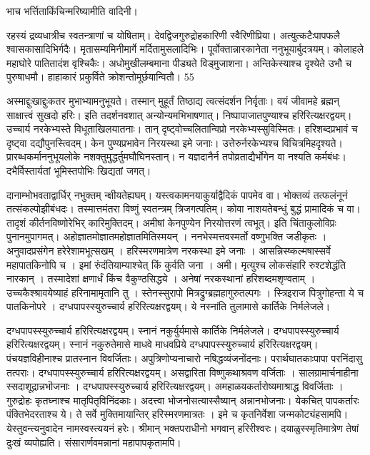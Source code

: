 भाच भर्त्तिताकिंचिन्मरिष्यामीति वादिनी।

रहस्यं द्रव्यधात्रीच स्वतन्त्राणां च योषिताम्।
देवद्विजगुरुद्रोहकारिणी स्वैरिणीप्रिया।
अत्युत्कटैःपापफलै श्वासकासादिभिर्गदैः।
मृतासम्यमिनीमार्गे मर्दितामुसलादिभिः।
पूर्वोक्तान्नारकानेता ननुभूयार्बुदत्रयम्।
कोलाहले महाघोरे पातितादंश वृश्चिकैः।
अधोमुखीलम्बमाना पीड्यते विड्मुजाशना।
अन्तिकेस्याश्च दृश्येते उभौ च पुरुषाधमौ।
हाहाकारं प्रकुर्विते क्रोशन्तोमूर्छयान्वितौ।
55

अस्माद्दुःखाद्दुःकतर मुभाभ्यामनुभूयते।
तस्मान् मुहूर्तं तिष्ठाद्य त्वत्संदर्शन निर्वृताः।
वयं जीवामहे ब्रह्मन् साक्षात्त्वं सुखदो हरिः।
इति तदर्शनवशात् अन्योन्यमभिभाषणात्।
निष्पापाजातपुण्याश्च हरिरित्यक्षरद्वयम्।
उच्चार्य नरकेभ्यस्ते विधूताखिलयातनाः।
तान् दृष्ट्वोच्चलितान्विप्रो नरकेभ्यस्सुविस्मितः।
हरिशब्दप्रभावं च दृष्ट्वा दद्यौपुनस्त्विदम्।
केन पुण्यप्रभावेन निरयस्था इमे जनाः।
उत्तेरुर्नरकेभ्यश्च विचित्रमिहदृश्यते।
प्रारब्धकर्माननुभूयलोके नशक्तुमुद्धर्तुमघौघिनस्तान्।
न यज्ञदानैर्न तपोव्रताद्यैर्भोगेन वा नश्यति कर्मबंधः।
दभैर्विस्तार्यतां भूमिस्तपोभिः खिद्यतां जगत्।

दानाम्भोभवताद्वार्धिर् नभुक्तम् न्क्षीयतेह्यघम्।
यस्त्वकामनयाकुर्याद्वैदिकं पापमेव वा।
भोक्तव्यं तत्फलंनूनं तत्संकल्पोझीबंधदः।
तस्मात्तमंतरा विष्णुं स्वतन्त्रम् त्रिजगत्पतिम्।
कोवा नाशयतेबन्धुं बुद्धं प्रामादिकं च वा।
तादृशं कीर्तनविष्णोरेभिर् कारिमुक्तिदम्।
अमीषां केनपुण्येन निरयोत्तरणं त्वभूत्।
इति चिंताकुलोविप्रः पुनानमुपागमत्।
अहोज्ञातमोज्ञातमहोज्ञातमितिस्मयन् ।
ननभेस्मत्तवस्मर्तो वष्णुभक्ति जडीकृतः ।
अनुवादप्रसंगेन हरेरेशामभूत्सखम् ।
हरिस्मरणमात्रेण नरकस्था इमे जनाः ।
आसन्निस्ष्कल्मषास्सर्वे महापातकिनोपि च ।
इमां रुंदंतियाम्याश्चेत् किं कुर्वति जना ।
अमी।
मृत्युश्च लोकसंहारि रुश्टशेद्धंति नारकान् ।
तस्मादेशां क्षणार्धं किंच वैकुण्ठसिद्धये ।
अनेषां नरकस्थानां हरिशब्दमशृण्वताम् ।
उच्चकैश्श्रावयेष्याहं हरिनामामृतानि तु ।
स्तेनस्सुरापो मित्रद्रुग्ब्रह्महागुरुतल्पगः ।
स्त्रिइराज पित्रुगोहन्ता ये च पातकिनोपरे ।
दग्धपापस्स्युरुच्चार्य हरिरित्यक्षरद्वयम्।
ये नस्नांति तुलामासे कार्तिके निर्मलेजले।

दग्धपापस्स्युरुच्चार्य हरिरित्यक्षरद्वयम्।
स्नानं नकुर्युर्यमासे कार्तिके निर्मलेजले।
दग्धपापस्स्युरुच्चार्य हरिरित्यक्षरद्वयम्।
स्नानं नकुरुतेमासे माधवे माधवप्रिये दग्धपापस्स्युरुच्चार्य हरिरित्यक्षरद्वयम्।
पंचयज्ञविहीनाश्च प्रातस्नान विवर्जिताः।
अपुत्रिणोप्यनाचारो नषिद्धव्यंजनोंदनाः।
परार्थघातकाःपापा परनिंदासु तत्पराः।
दग्धपापस्स्युरुच्चार्य हरिरित्यक्षरद्वयम्।
असद्वारिता विष्णुकथाश्रवण वर्जिताः ।
सालग्रामार्चनाहीना स्सदाशूद्रान्नभॊजनाः ।
दग्धपापस्स्युरुच्चार्य हरिरित्यक्षरद्वयम्।
अमहाळयकर्तारोष्यमाश्राद्ध विवर्जिताः ।
गुरुद्रोहः कृतघ्नाश्च मातृपितृविनिंदकाः।
अदत्त्वा भोजनोसत्यास्सैष्यान् अन्नानभोजनाः।
येकचित् पापकर्तारः पंक्तिभेदरताश्च ये।
ते सर्वे मुक्तिमायान्तिर् हरिस्मरणमात्रतः ।
इमे च कृतनिर्वेशा जन्मकोट्यंहसामपि।
येस्तुवन्त्यनुवादेन नामस्वस्त्ययनं हरेः।
श्रीमान् भक्तपराधीनो भगवान् हरिरीश्वरः।
दयाळुस्स्मृतिमात्रेण तेषां दुःखं व्यपोह्यति।
संसारार्णवमन्नानां महापापकृतामपि।

